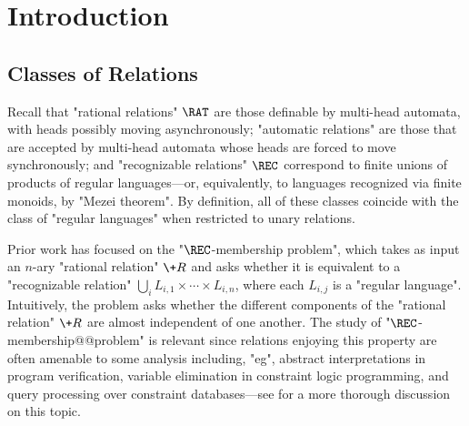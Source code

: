 \section{Introduction}
\label{sec:dichotomy-introduction}


\subsection{Classes of Relations}
\label{sec:dichotomy-introduction-relations}

Recall that \AP"rational relations" $\RAT$
are those definable by multi-head automata,
with heads possibly moving asynchronously;
"automatic relations"
are those that are accepted by multi-head automata
whose heads are forced to move synchronously; and 
\AP"recognizable relations" $\REC$ correspond to finite unions of products of regular languages---or, equivalently, to languages recognized via finite monoids, by "Mezei theorem".
By definition, all of these classes coincide with the 
class of "regular languages" when restricted to unary relations.


Prior work has focused on the "$\REC$-membership problem", 
which takes as input an $n$-ary "rational relation"
$\+R$ and asks whether it is equivalent to a "recognizable relation"
$\bigcup_i L_{i,1} \times \cdots \times L_{i,n}$, where each $L_{i,j}$ is a "regular language". 
Intuitively, the problem asks whether the different components of  
the "rational relation" $\+R$ are almost independent of one another.
The study of "$\REC$-membership@@problem"
is relevant since relations enjoying this property are often amenable to some analysis including,
"eg", abstract interpretations in program verification, variable elimination in constraint logic 
programming, and query processing over constraint databases---see \cite[Introduction]{BarceloHongLeLinNiskanen2019MonadicDecomposability} for a more thorough discussion on this topic.


